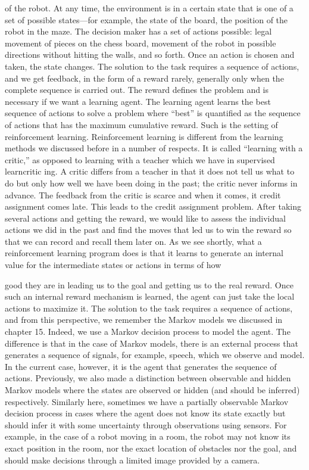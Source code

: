 of the robot. At any time, the environment is in a certain state that is one of a set of possible states---for example, the state of the board, the position of the robot in the maze. The decision maker has a set of actions possible: legal movement of pieces on the chess board, movement of the robot in possible directions without hitting the walls, and so forth. Once an action is chosen and taken, the state changes. The solution to the task requires a sequence of actions, and we get feedback, in the form of a reward rarely, generally only when the complete sequence is carried out. The reward defines the problem and is necessary if we want a learning agent. The learning agent learns the best sequence of actions to solve a problem where “best” is quantified as the sequence of actions that has the maximum cumulative reward. Such is the setting of reinforcement learning. Reinforcement learning is different from the learning methods we discussed before in a number of respects. It is called “learning with a critic,” as opposed to learning with a teacher which we have in supervised learncritic ing. A critic differs from a teacher in that it does not tell us what to do but only how well we have been doing in the past; the critic never informs in advance. The feedback from the critic is scarce and when it comes, it credit assignment comes late. This leads to the credit assignment problem. After taking several actions and getting the reward, we would like to assess the individual actions we did in the past and find the moves that led us to win the reward so that we can record and recall them later on. As we see shortly, what a reinforcement learning program does is that it learns to generate an internal value for the intermediate states or actions in terms of how

good they are in leading us to the goal and getting us to the real reward. Once such an internal reward mechanism is learned, the agent can just take the local actions to maximize it. The solution to the task requires a sequence of actions, and from this perspective, we remember the Markov models we discussed in chapter 15. Indeed, we use a Markov decision process to model the agent. The difference is that in the case of Markov models, there is an external process that generates a sequence of signals, for example, speech, which we observe and model. In the current case, however, it is the agent that generates the sequence of actions. Previously, we also made a distinction between observable and hidden Markov models where the states are observed or hidden (and should be inferred) respectively. Similarly here, sometimes we have a partially observable Markov decision process in cases where the agent does not know its state exactly but should infer it with some uncertainty through observations using sensors. For example, in the case of a robot moving in a room, the robot may not know its exact position in the room, nor the exact location of obstacles nor the goal, and should make decisions through a limited image provided by a camera.

